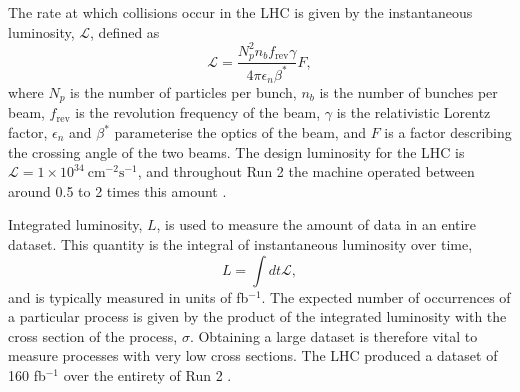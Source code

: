 The rate at which collisions occur in the \ac{LHC} is given by the instantaneous
luminosity, $\mathcal{L}$, defined as \cite{Evans2008}
\begin{equation*}
  \mathcal{L} = \frac{ N_p^2 n_b f_\text{rev} \gamma }
  { 4 \pi \epsilon_n \beta^*} F,
\end{equation*}
%
where $N_p$ is the number of particles per bunch, $n_b$ is the number of bunches
per beam, $f_\text{rev}$ is the revolution frequency of the beam, $\gamma$ is
the relativistic Lorentz factor, $\epsilon_n$ and $\beta^*$ parameterise the
optics of the beam, and $F$ is a factor describing the crossing angle of the two
beams. The design luminosity for the \ac{LHC} is $\mathcal{L} =
1\times10^{34}~\text{cm}^{-2}\text{s}^{-1}$, and throughout Run 2 the machine
operated between around 0.5 to 2 times this amount \cite{Steerenberg2019}.

Integrated luminosity, $L$, is used to measure the amount of data in an entire
dataset. This quantity is the integral of instantaneous luminosity over time,
\begin{equation*}
  L = \int dt \mathcal{L},
\end{equation*}
and is typically measured in units of fb$^{-1}$.
The expected number of occurrences of a particular process is given by the
product of the integrated luminosity with the cross section of the process,
$\sigma$. Obtaining a large dataset is therefore vital to measure processes with
very low cross sections. The \ac{LHC} produced a dataset of 160 fb$^{-1}$ over
the entirety of Run 2 \cite{Steerenberg2019}.

